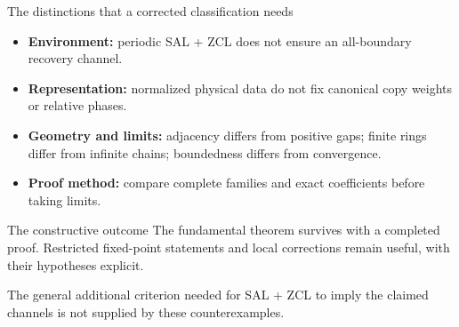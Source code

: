 \documentclass[aspectratio=169,14pt]{beamer}
\begin{document}
\begin{frame}{The distinctions that a corrected classification needs}
\begin{itemize}
\item \textbf{Environment:} periodic SAL + ZCL does not ensure an all-boundary recovery channel.
\item \textbf{Representation:} normalized physical data do not fix canonical copy weights or relative phases.
\item \textbf{Geometry and limits:} adjacency differs from positive gaps; finite rings differ from infinite chains; boundedness differs from convergence.
\item \textbf{Proof method:} compare complete families and exact coefficients before taking limits.
\end{itemize}
\begin{block}{The constructive outcome}
The fundamental theorem survives with a completed proof. Restricted fixed-point statements and local corrections remain useful, with their hypotheses explicit.
\end{block}
The general additional criterion needed for SAL + ZCL to imply the claimed channels is not supplied by these counterexamples.
\end{frame}
\appendix
{}
\end{document}
